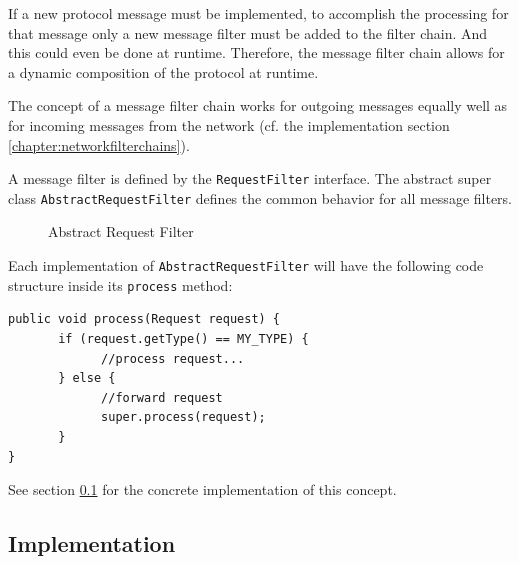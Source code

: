 If a new protocol message must be implemented, to accomplish the processing for that message only a new message filter must be added to the filter chain. And this could even be done at runtime. Therefore, the message filter chain allows for a dynamic composition of the protocol at runtime.

The concept of a message filter chain works for outgoing messages equally well as for incoming messages from the network (cf. the implementation section \ref{chapter:networkfilterchains}). 

A message filter is defined by the \texttt{RequestFilter} interface. The abstract super class \texttt{Abstract\-Request\-Filter} defines the common behavior for all message filters.

\begin{figure}[H]
 \centering
 \caption{Abstract Request Filter}
 \label{fig:network.discovery.abstractrequestfilter.uml}
\end{figure}


Each implementation of \texttt{AbstractRequestFilter} will have the following code structure inside its \texttt{process} method:

\begin{verbatim}
public void process(Request request) {
       if (request.getType() == MY_TYPE) {
             //process request...
       } else { 
             //forward request
             super.process(request);
       }
}
\end{verbatim}

See section \ref{network.communication.implementation} for the concrete implementation of this concept.

\newpage
\subsection{Implementation}
 \label{network.communication.implementation}

